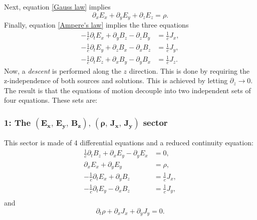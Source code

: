 \documentclass{article}
\begin{document}
Next, equation \eqref{Gauss law} implies
\begin{equation}
    \partial_{x}E_{x}+\partial_{y}E_{y}+\partial_{z}E_{z}=\rho.
\end{equation}
Finally, equation \eqref{Ampere's law} implies the three equations
\begin{align}
    -\frac{1}{c}\partial_{t}E_{x}+\partial_{y}B_{z}-\partial_{z}B_{y}&=\frac{1}{c}J_{x},\\
    -\frac{1}{c}\partial_{t}E_{y}+\partial_{z}B_{x}-\partial_{x}B_{z}&=\frac{1}{c}J_{y},\\
    -\frac{1}{c}\partial_{t}E_{z}+\partial_{x}B_{y}-\partial_{y}B_{x}&=\frac{1}{c}J_{z}.
\end{align}
Now, a \textit{descent} is performed along the $z$ direction. This is done by requiring the z-independence of both sources and solutions. This is achieved by letting $\partial_{z}\rightarrow 0$. The result is that the equations of motion decouple into two independent sets of four equations. These sets are:\newline
\subsubsection*{1: The $\mathbf{\left(E_{x},\,E_{y},\,B_{z}\right),\,\left(\rho,\,J_{x},\,J_{y}\right)}$ sector}
This sector is made of 4 differential equations and a reduced continuity equation:
\begin{align}
    \frac{1}{c}\partial_{t}B_{z}+\partial_{x}E_{y}-\partial_{y}E_{x}&=0,\\
    \partial_{x}E_{x}+\partial_{y}E_{y}&=\rho,\\
    -\frac{1}{c}\partial_{t}E_{x}+\partial_{y}B_{z}&=\frac{1}{c}J_{x},\\
    -\frac{1}{c}\partial_{t}E_{y}-\partial_{x}B_{z}&=\frac{1}{c}J_{y},\\
\end{align}
and \begin{equation}
    \partial_{t}\rho+\partial_{x}J_{x}+\partial_{y}J_{y}=0.
\end{equation}
\end{document}
